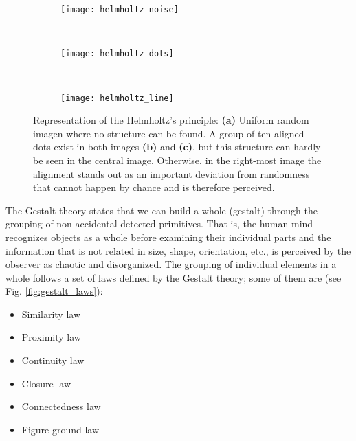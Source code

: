 \begin{figure}[!ht]
    \centering
    \begin{subfigure}[b]{0.25\textwidth}
        \texttt{[image: helmholtz\_noise]}
        \caption{}
        \label{fig:helmholtz_noise}
    \end{subfigure}
        ~ %
    \begin{subfigure}[b]{0.25\textwidth}
        \texttt{[image: helmholtz\_dots]}
        \caption{}
        \label{fig:helmholtz_dots}
    \end{subfigure}
        ~ %
    \begin{subfigure}[b]{0.25\textwidth}
        \texttt{[image: helmholtz\_line]}
        \caption{}
        \label{fig:helmholtz_line}
    \end{subfigure}
        
    \caption{Representation of the Helmholtz's principle: \textbf{(a)} Uniform random imagen where no structure can be found. A group of ten aligned dots exist in both images \textbf{(b)} and \textbf{(c)}, but this structure can hardly be seen in the central image. Otherwise, in the right-most image the alignment stands out as an important deviation from randomness that cannot happen by chance and is therefore perceived.}\label{fig:helmholtz_principle}
\end{figure}





The Gestalt theory \citep{Wertheimer:Psycologische:1923} states that we can build a whole (gestalt) through the grouping of non-accidental detected primitives. That is, the human mind recognizes objects as a whole before examining their individual parts and the information that is not related in size, shape, orientation, etc., is perceived by the observer as chaotic and disorganized. The grouping of individual elements in a whole follows a set of laws defined by the Gestalt theory; some of them are (see Fig. \ref{fig:gestalt_laws}):

\begin{itemize}
	\item Similarity law
	\item Proximity law
	\item Continuity law
	\item Closure law
	\item Connectedness law
	\item Figure-ground law
	
\end{itemize}


